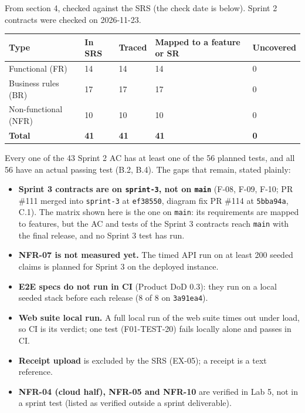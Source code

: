 \label{D:4}

From  section 4, checked against the SRS (the check date is below). Sprint 2 contracts were checked on 2026-11-23.

\begin{center}\small
\begin{tabular}{@{}lllll@{}}
\toprule \textbf{Type} & \textbf{In SRS} & \textbf{Traced} & \textbf{Mapped to a feature or SR} & \textbf{Uncovered} \\ \midrule
Functional (FR) & 14 & 14 & 14 & 0 \\
Business rules (BR) & 17 & 17 & 17 & 0 \\
Non-functional (NFR) & 10 & 10 & 10 & 0 \\
\textbf{Total} & \textbf{41} & \textbf{41} & \textbf{41} & \textbf{0} \\
\bottomrule
\end{tabular}
\end{center}

Every one of the 43 Sprint 2 AC has at least one of the 56 planned tests, and all 56 have an actual passing test (B.2, B.4). The gaps that remain, stated plainly:

\begin{itemize}\setlength\itemsep{2pt}
\item \textbf{Sprint 3 contracts are on \texttt{sprint-3}, not on \texttt{main}} (F-08, F-09, F-10; PR \#111 merged into \texttt{sprint-3} at \texttt{ef38550}, diagram fix PR \#114 at \texttt{5bba94a}, C.1). The matrix shown here is the one on \texttt{main}: its requirements are mapped to features, but the AC and tests of the Sprint 3 contracts reach \texttt{main} with the final release, and no Sprint 3 test has run.
\item \textbf{NFR-07 is not measured yet.} The timed API run on at least 200 seeded claims is planned for Sprint 3 on the deployed instance.
\item \textbf{E2E specs do not run in CI} (Product DoD 0.3): they run on a local seeded stack before each release (8 of 8 on \texttt{3a91ea4}).
\item \textbf{Web suite local run.} A full local run of the web suite times out under load, so CI is its verdict; one test (F01-TEST-20) fails locally alone and passes in CI.
\item \textbf{Receipt upload} is excluded by the SRS (EX-05); a receipt is a text reference.
\item \textbf{NFR-04 (cloud half), NFR-05 and NFR-10} are verified in Lab 5, not in a sprint test (listed as verified outside a sprint deliverable).
\end{itemize}

